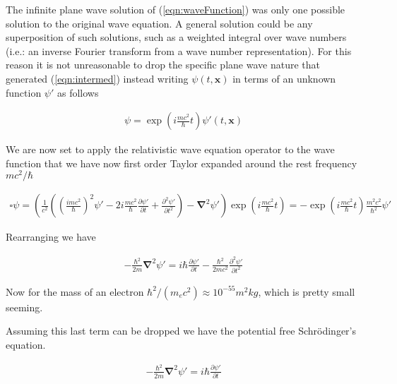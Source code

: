 \documentclass[]{eliblog}
\newcommand{\Bx}[0]{\mathbf{x}}
\newcommand{\spacegrad}[0]{\boldsymbol{\nabla}}
\newcommand{\delambertian}[0]{\square}
\begin{document}
The infinite plane wave solution of (\ref{eqn:waveFunction}) was only one possible solution to the original wave equation.
A general solution could be any superposition of such solutions, such as a weighted integral over wave numbers (i.e.: an
inverse Fourier transform from a wave number representation).  For this reason it is not unreasonable to drop the specific plane wave nature that generated (\ref{eqn:intermed}) instead writing $\psi(t,\Bx)$ in terms of an unknown function $\psi'$ as follows

\begin{align}
\psi = \exp\left( i \frac{m c^2}{\hbar} t \right) \psi'(t, \Bx)
\end{align}

We are now set to apply the relativistic wave equation operator to the wave function that we have now first order Taylor expanded
around the rest frequency $m c^2/\hbar$

\begin{align}
\delambertian \psi
=
\left(
\frac{1}{c^2}
\left(
\left( \frac{i m c^2}{\hbar} \right)^2 \psi' - 2 i \frac{m c^2}{\hbar} \frac{\partial \psi'}{\partial t} +
\frac{\partial^2 \psi'}{\partial t^2}
\right)
-
\spacegrad^2 \psi'
\right)
\exp\left( i \frac{m c^2}{\hbar} t \right)
= -
\exp\left( i \frac{m c^2}{\hbar} t \right)
\frac{m^2 c^2}{\hbar^2} \psi'
\end{align}

Rearranging we have

\begin{align}
-\frac{\hbar^2}{2m} \spacegrad^2 \psi' = i \hbar \frac{\partial \psi'}{\partial t} -\frac{\hbar^2}{2m c^2} \frac{\partial^2 \psi'}{\partial t^2}
\end{align}

Now for the mass of an electron $\hbar^2/(m_e c^2) \approx 10^{-55} m^2 kg$, which is pretty small seeming.

Assuming this last term can be dropped we have the potential free Schr\"{o}dinger's equation.

\begin{align}
-\frac{\hbar^2}{2m} \spacegrad^2 \psi' = i \hbar \frac{\partial \psi'}{\partial t}
\end{align}
\end{document}
